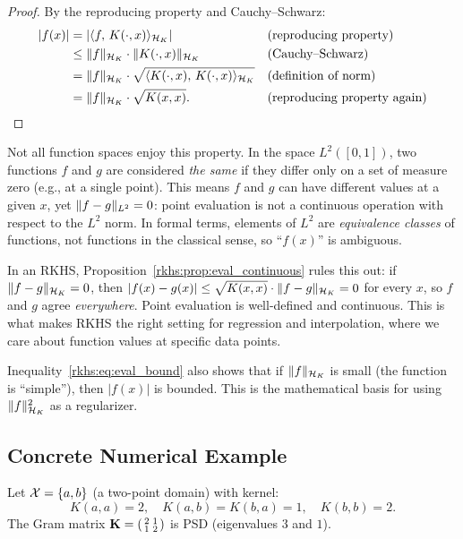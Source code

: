 \begin{notechapter}
\begin{proof}
By the reproducing property and Cauchy--Schwarz:
\begin{align*}
|f(x)|
&= |\langle f,\, K(\cdot,x) \rangle_{\mathcal{H}_K}|
  && \text{(reproducing property)} \\
&\leq \| f \|_{\mathcal{H}_K} \cdot
  \| K(\cdot,x) \|_{\mathcal{H}_K}
  && \text{(Cauchy--Schwarz)} \\
&= \| f \|_{\mathcal{H}_K} \cdot
  \sqrt{\langle K(\cdot,x),\, K(\cdot,x) \rangle_{\mathcal{H}_K}}
  && \text{(definition of norm)} \\
&= \| f \|_{\mathcal{H}_K} \cdot \sqrt{K(x,x)}.
  && \text{(reproducing property again)}
\end{align*}
\end{proof}

\begin{insightbox}
Not all function spaces enjoy this property.
In the space $L^2([0,1])$, two functions $f$ and $g$
are considered \emph{the same} if they differ only on
a set of measure zero (e.g., at a single point). This
means $f$ and $g$ can have different values at a given
$x$, yet $\| f - g \|_{L^2} = 0$: point evaluation
is not a continuous operation with respect to the
$L^2$ norm. In formal terms, elements of $L^2$ are
\emph{equivalence classes} of functions, not functions
in the classical sense, so ``$f(x)$'' is ambiguous.

In an RKHS, Proposition~\ref{rkhs:prop:eval_continuous}
rules this out: if $\| f - g \|_{\mathcal{H}_K} = 0$, then
$|f(x) - g(x)| \leq \sqrt{K(x,x)}
\cdot \| f - g \|_{\mathcal{H}_K} = 0$ for every $x$, so
$f$ and $g$ agree \emph{everywhere}. Point evaluation
is well-defined and continuous. This is what makes
RKHS the right setting for regression and
interpolation, where we care about function values
at specific data points.

Inequality~\eqref{rkhs:eq:eval_bound} also shows that if
$\| f \|_{\mathcal{H}_K}$ is small (the function is
``simple''), then $|f(x)|$ is bounded. This is the
mathematical basis for using $\| f \|_{\mathcal{H}_K}^2$ as a
regularizer.
\end{insightbox}

\subsection{Concrete Numerical Example}

\begin{examplebox}
Let $\mathcal{X} = \{a, b\}$ (a two-point domain) with kernel:
\[
K(a,a) = 2, \quad K(a,b) = K(b,a) = 1, \quad K(b,b) = 2.
\]
The Gram matrix $\mathbf{K} = \begin{psmallmatrix} 2 & 1 \\ 1 & 2
\end{psmallmatrix}$ is PSD (eigenvalues $3$ and $1$). \checkmark


\end{examplebox}
\end{notechapter}
